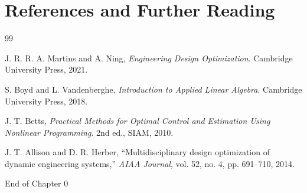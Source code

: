 \documentclass[11pt]{article}
\begin{document}
\section{References and Further Reading}

\begin{thebibliography}{99}

J. R. R. A. Martins and A. Ning, \emph{Engineering Design Optimization}. Cambridge University Press, 2021.

S. Boyd and L. Vandenberghe, \emph{Introduction to Applied Linear Algebra}. Cambridge University Press, 2018.

J. T. Betts, \emph{Practical Methods for Optimal Control and Estimation Using Nonlinear Programming}. 2nd ed., SIAM, 2010.

J. T. Allison and D. R. Herber, ``Multidisciplinary design optimization of dynamic engineering systems,'' \emph{AIAA Journal}, vol. 52, no. 4, pp. 691--710, 2014.

\end{thebibliography}

\vfill
\begin{center}
\small\color{CCDgray}
End of Chapter 0
\end{center}
\end{document}
